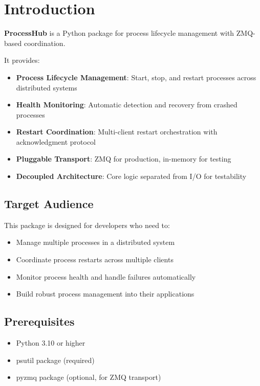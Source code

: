 %
%
%
%
%

\section{Introduction}

\textbf{ProcessHub} is a Python package for process lifecycle management with ZMQ-based coordination.

It provides:

\begin{itemize}
   \item \textbf{Process Lifecycle Management}: Start, stop, and restart processes across distributed systems
   \item \textbf{Health Monitoring}: Automatic detection and recovery from crashed processes
   \item \textbf{Restart Coordination}: Multi-client restart orchestration with acknowledgment protocol
   \item \textbf{Pluggable Transport}: ZMQ for production, in-memory for testing
   \item \textbf{Decoupled Architecture}: Core logic separated from I/O for testability
\end{itemize}

\subsection{Target Audience}

This package is designed for developers who need to:

\begin{itemize}
   \item Manage multiple processes in a distributed system
   \item Coordinate process restarts across multiple clients
   \item Monitor process health and handle failures automatically
   \item Build robust process management into their applications
\end{itemize}

\subsection{Prerequisites}

\begin{itemize}
   \item Python 3.10 or higher
   \item psutil package (required)
   \item pyzmq package (optional, for ZMQ transport)
\end{itemize}
